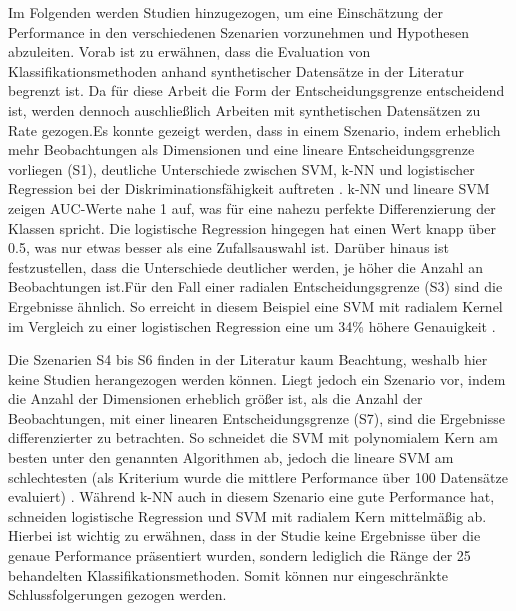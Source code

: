 \documentclass[
]{article}
\begin{document}
Im Folgenden werden Studien hinzugezogen, um eine Einschätzung der
Performance in den verschiedenen Szenarien vorzunehmen und Hypothesen
abzuleiten. Vorab ist zu erwähnen, dass die Evaluation von
Klassifikationsmethoden anhand synthetischer Datensätze in der Literatur
begrenzt ist. Da für diese Arbeit die Form der Entscheidungsgrenze
entscheidend ist, werden dennoch auschließlich Arbeiten mit
synthetischen Datensätzen zu Rate gezogen.\newline Es konnte gezeigt
werden, dass in einem Szenario, indem erheblich mehr Beobachtungen als
Dimensionen und eine lineare Entscheidungsgrenze vorliegen (S1),
deutliche Unterschiede zwischen SVM, k-NN und logistischer Regression
bei der Diskriminationsfähigkeit auftreten
\parencite{entezari-malekiComparisonClassificationMethods2009}. k-NN und
lineare SVM zeigen AUC-Werte nahe 1 auf, was für eine nahezu perfekte
Differenzierung der Klassen spricht. Die logistische Regression hingegen
hat einen Wert knapp über 0.5, was nur etwas besser als eine
Zufallsauswahl ist. Darüber hinaus ist festzustellen, dass die
Unterschiede deutlicher werden, je höher die Anzahl an Beobachtungen
ist.\newline Für den Fall einer radialen Entscheidungsgrenze (S3) sind
die Ergebnisse ähnlich. So erreicht in diesem Beispiel eine SVM mit
radialem Kernel im Vergleich zu einer logistischen Regression eine um
34\% höhere Genauigkeit
\parencite{faveroClassificationPerformanceEvaluation2022}.

Die Szenarien S4 bis S6 finden in der Literatur kaum Beachtung, weshalb
hier keine Studien herangezogen werden können. Liegt jedoch ein Szenario
vor, indem die Anzahl der Dimensionen erheblich größer ist, als die
Anzahl der Beobachtungen, mit einer linearen Entscheidungsgrenze (S7),
sind die Ergebnisse differenzierter zu betrachten. So schneidet die SVM
mit polynomialem Kern am besten unter den genannten Algorithmen ab,
jedoch die lineare SVM am schlechtesten (als Kriterium wurde die
mittlere Performance über 100 Datensätze evaluiert)
\parencite{scholzComparisonClassificationMethods2021}. Während k-NN auch
in diesem Szenario eine gute Performance hat, schneiden logistische
Regression und SVM mit radialem Kern mittelmäßig ab. Hierbei ist wichtig
zu erwähnen, dass in der Studie keine Ergebnisse über die genaue
Performance präsentiert wurden, sondern lediglich die Ränge der 25
behandelten Klassifikationsmethoden. Somit können nur eingeschränkte
Schlussfolgerungen gezogen werden.
\end{document}
